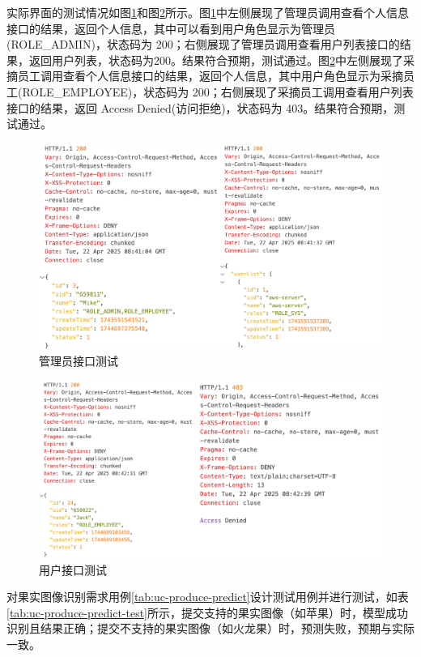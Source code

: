 实际界面的测试情况如图\ref{fig:rest-test-user-auth-admin}和图\ref{fig:rest-test-user-auth-emp}所示。图\ref{fig:rest-test-user-auth-admin}中左侧展现了管理员调用查看个人信息接口的结果，返回个人信息，其中可以看到用户角色显示为管理员(ROLE\_ADMIN)，状态码为 200；右侧展现了管理员调用查看用户列表接口的结果，返回用户列表，状态码为200。结果符合预期，测试通过。图\ref{fig:rest-test-user-auth-emp}中左侧展现了采摘员工调用查看个人信息接口的结果，返回个人信息，其中用户角色显示为采摘员工(ROLE\_EMPLOYEE)，状态码为 200；右侧展现了采摘员工调用查看用户列表接口的结果，返回 Access Denied(访问拒绝)，状态码为 403。结果符合预期，测试通过。

\begin{figure}
    \centering
    \includegraphics[width=0.9\linewidth]{../result/rest-test-user-auth-admin.png}
    \caption{管理员接口测试}
    \label{fig:rest-test-user-auth-admin}
\end{figure}

\begin{figure}
    \centering
    \includegraphics[width=0.9\linewidth]{../result/rest-test-user-auth-emp.png}
    \caption{用户接口测试}
    \label{fig:rest-test-user-auth-emp}
\end{figure}

对果实图像识别需求用例\ref{tab:uc-produce-predict}设计测试用例并进行测试，如表\ref{tab:uc-produce-predict-test}所示，提交支持的果实图像（如苹果）时，模型成功识别且结果正确；提交不支持的果实图像（如火龙果）时，预测失败，预期与实际一致。

